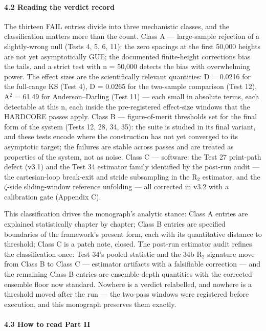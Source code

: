 \documentclass[10pt]{article}
\begin{document}
\paragraph{4.2 Reading the verdict record}

The thirteen FAIL entries divide into three mechanistic classes, and the classification matters more than the count. Class A --- large-sample rejection of a slightly-wrong null (Tests 4, 5, 6, 11): the zero spacings at the first 50,000 heights are not yet asymptotically GUE; the documented finite-height corrections bias the tails, and a strict test with n = 50,000 detects the bias with overwhelming power. The effect sizes are the scientifically relevant quantities: D = 0.0216 for the full-range KS (Test 4), D = 0.0265 for the two-sample comparison (Test 12), A$^2$ = 61.49 for Anderson--Darling (Test 11) --- each small in absolute terms, each detectable at this n, each inside the pre-registered effect-size windows that the HARDCORE passes apply. Class B --- figure-of-merit thresholds set for the final form of the system (Tests 12, 28, 34, 35): the suite is studied in its final variant, and these tests encode where the construction has not yet converged to its asymptotic target; the failures are stable across passes and are treated as properties of the system, not as noise. Class C --- software: the Test 27 print-path defect (v3.1) and the Test 34 estimator family identified by the post-run audit --- the cartesian-loop break-exit and stride subsampling in the R$_2$ estimator, and the $\zeta$-side sliding-window reference unfolding --- all corrected in v3.2 with a calibration gate (Appendix C).

This classification drives the monograph's analytic stance: Class A entries are explained statistically chapter by chapter; Class B entries are specified boundaries of the framework's present form, each with its quantitative distance to threshold; Class C is a patch note, closed. The post-run estimator audit refines the classification once: Test 34's pooled statistic and the 34b R$_2$ signature move from Class B to Class C --- estimator artifacts with a falsifiable correction --- and the remaining Class B entries are ensemble-depth quantities with the corrected ensemble floor now standard. Nowhere is a verdict relabelled, and nowhere is a threshold moved after the run --- the two-pass windows were registered before execution, and this monograph preserves them exactly.

\paragraph{4.3 How to read Part II}
\end{document}
